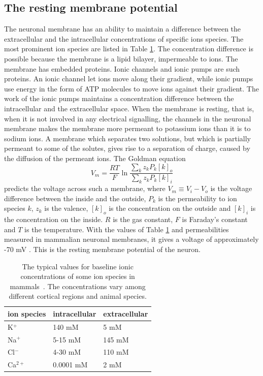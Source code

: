 \documentclass{uiophd}
\begin{document}
\subsection{The resting membrane potential}

The neuronal membrane has an ability to maintain a difference between the extracellular and the intracellular concentrations of specific ions species. The most prominent ion species are listed in Table \ref{tab:ionic_concentrations}.
The concentration difference is possible because the membrane is a lipid bilayer, impermeable to ions. The membrane has embedded proteins. Ionic channels and ionic pumps are such proteins. An ionic channel let ions move along their gradient, while ionic pumps use energy in the form of ATP molecules to move ions against their gradient. The work of the ionic pumps maintains a concentration difference between the intracellular and the extracellular space. When the membrane is resting, that is, when it is not involved in any electrical signalling, the channels in the neuronal membrane makes the membrane more permeant to potassium ions than it is to sodium ions. A membrane which separates two solutions, but which is partially permeant to some of the solutes, gives rise to a separation of charge, caused by the diffusion of the permeant ions.  The Goldman equation 
\begin{equation}\label{eq:goldman}
V_m = \frac{RT}{F}\ln \frac{\sum_k z_kP_k[k]_o}{\sum_k z_kP_k[k]_i}
\end{equation}
predicts the voltage across such a membrane, where $V_m \equiv V_i-V_o$ is the voltage difference between the inside and the outside, $P_k$ is the permeability to ion species $k$, $z_k$ is the valence, $[k]_o$ is the concentration on the outside and $[k]_i$ is the concentration on the inside. $R$ is the gas constant, $F$ is Faraday's constant and $T$ is the temperature. With the values of Table \ref{tab:ionic_concentrations} and permeabilities measured in mammalian neuronal membranes, it gives a voltage of approximately -70 mV \cite{Neuroscience}. This is the resting membrane potential of the neuron. 
\begin{table}[h!]
  \centering
  \caption{The typical values for baseline ionic concentrations of some ion species in mammals~\cite{Neuroscience}. The concentrations vary among different cortical regions and animal species.}
  \label{tab:ionic_concentrations}
  \begin{tabular}{l||l|l}
ion species & intracellular & extracellular \\
\hline
K$^+$ & 140 mM & 5  mM\\
Na$^+$ & 5-15 mM & 145 mM\\
Cl$^-$ & 4-30 mM& 110 mM\\
Ca$^{2+}$ & 0.0001 mM & 2 mM  \\
 \end{tabular}
\end{table}
\end{document}
